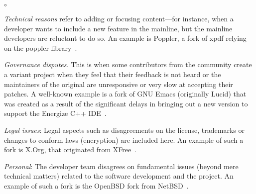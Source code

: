 
\begin{list}{$\circ$}{}
   \item \textit{Technical reasons} refer to adding or focusing content---for instance, when a developer wants to include a new feature in the mainline, but the mainline developers are reluctant to do so. An example is \textsf{Poppler}, a fork of \textsf{xpdf} relying on the \textsf{poppler} library~\cite{Gregorio:2012,Wheeler:2015Forking}.

    \item \textit{Governance disputes.} This is when some contributors from the community create a variant project when they feel that their feedback is not heard or the maintainers of the original are unresponsive or very slow at accepting their patches. A well-known example is a fork of \textsf{GNU Emacs} (originally \textsf{Lucid}) that was created as a result of the significant delays in bringing out a new version to support the Energize C++ IDE~\cite{Wheeler:2015Forking}.

\item \textit{Legal issues}: Legal aspects such as disagreements on the license, trademarks or changes to conform laws (encryption) are included here. An example of such a fork is \textsf{X.Org}, that originated from \textsf{XFree}~\cite{Gregorio:2012,Wheeler:2015Forking}.

\item \textit{Personal}: The developer team disagrees on fundamental issues (beyond mere technical matters) related to the software development and the project. An example of such a fork is the \textsf{OpenBSD} fork from \textsf{NetBSD}~\cite{Gregorio:2012}.


\end{list}

